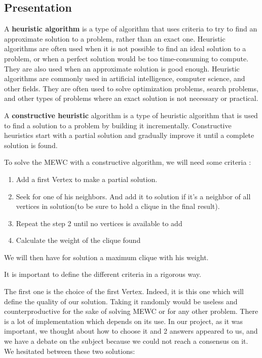 
\subsection{Presentation}

A \textbf{heuristic algorithm} is a type of algorithm that uses criteria to try to find an approximate solution to a problem, rather than an exact one. Heuristic algorithms are often used when it is not possible to find an ideal solution to a problem, or when a perfect solution would be too time-consuming to compute. They are also used when an approximate solution is good enough. Heuristic algorithms are commonly used in artificial intelligence, computer science, and other fields. They are often used to solve optimization problems, search problems, and other types of problems where an exact solution is not necessary or practical.
\bigskip

A \textbf{constructive heuristic} algorithm is a type of heuristic algorithm that is used to find a solution to a problem by building it incrementally. Constructive heuristics start with a partial solution and gradually improve it until a complete solution is found.
\bigskip

To solve the MEWC with a constructive algorithm, we will need some criteria :

\begin{enumerate}
    \item Add a first Vertex to make a partial solution.
    \item Seek for one of his neighbors. And add it to solution if it's a neighbor of all vertices in solution(to be sure to hold a clique in the final result).
    \item Repeat the step 2 until no vertices is available to add
    \item Calculate the weight of the clique found
\end{enumerate}

We will then have for solution a maximum clique with his weight.
\bigskip

It is important to define the different criteria in a rigorous way.
\bigskip

The first one is the choice of the first Vertex. Indeed, it is this one which will define the quality of our solution. Taking it randomly would be useless and counterproductive for the sake of solving MEWC or for any other problem. There is a lot of implementation which depends on its use. In our project, as it was important, we thought about how to choose it and 2 answers appeared to us, and we have a debate on the subject because we could not reach a consensus on it. We hesitated between these two solutions:

